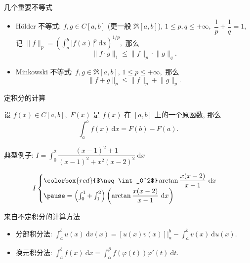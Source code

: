 
\begin{frame}{几个重要不等式}

\begin{itemize}[<+->]
\item H\"older 不等式: $f, g \in C[a, b]$ (更一般 $\mathfrak{R}[a, b]$), $1 \leqslant p, q \leqslant +\infty,$ $\dfrac{1}{p} + \dfrac{1}{q} = 1,$ 记 $\lVert f \rVert_p = \left( \int_a^b \lvert f(x) \rvert^p ~ \mathrm{d} x \right)^{1/p},$ 那么
\[\lVert f \cdot g \rVert_1 \leqslant \lVert f \rVert_p \cdot \lVert g \rVert_q.\]
\item Minkowski 不等式: $f, g \in \mathfrak{R}[a, b]$, $1 \leqslant p \leqslant +\infty,$ 那么
\[\lVert f + g \rVert_p \leqslant \lVert f \rVert_p + \lVert g \rVert_p.\]
\end{itemize}

\end{frame}


\begin{frame}{定积分的计算}

\begin{thm}
设 $f(x) \in C[a, b],$ $F(x)$ 是 $f(x)$ 在 $[a, b]$ 上的一个{\color{red}原函数}, 那么
\[\int_a^b f(x) ~ \mathrm{d} x = F(b) - F(a).\]
\end{thm}

\pause

典型例子: $I = \int_0^2 \dfrac{(x-1)^2 + 1}{(x-1)^2 + x^2(x-2)^2} ~ \mathrm{d} x$

\pause

\[I \begin{cases}
\colorbox{red}{$\neq \int_0^2$} \arctan \dfrac{x(x-2)}{x-1} ~ \mathrm{d} x \\
\pause
= \left( \int_0^1 + \int_1^2 \right) \left( \arctan \dfrac{x(x-2)}{x-1} ~ \mathrm{d} x \right)
\end{cases}\]

\end{frame}


\begin{frame}{来自不定积分的计算方法}

\begin{itemize}[<+->]
\item 分部积分法: $\int_a^b u(x) ~ \mathrm{d} v(x) = \left. \left[ u(x)v(x) \right] \right|_a^b - \int_a^b v(x) ~ \mathrm{d} u(x).$
\vspace{1em}
\item 换元积分法: $\int_a^b f(x) ~ \mathrm{d} x = \int_\alpha^\beta f(\varphi(t)) \varphi'(t) ~ \mathrm{d} t.$
\end{itemize}

\end{frame}

